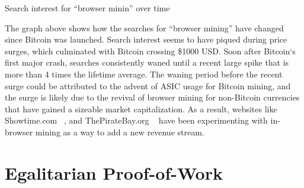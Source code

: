 \begin{center}
	\caption{Search interest for ``browser minin'' over time}
\end{center}

The graph above shows how the searches for ``browser mining'' have changed since Bitcoin was launched. Search interest seems to have piqued during price surges, which culminated with Bitcoin crossing \$1000 USD. Soon after Bitcoin`s first major crash, searches consistently waned until a recent large spike that is more than 4 times the lifetime average. The waning period before the recent surge could be attributed to the advent of ASIC usage for Bitcoin mining, and the surge is likely due to the revival of browser mining for non-Bitcoin currencies that have gained a sizeable market capitalization. As a result, websites like Showtime.com ~\cite{showtimehive}, and ThePirateBay.org ~\cite{piratesbayhive} have been experimenting with in-browser mining as a way to add a new revenue stream.

\section{Egalitarian Proof-of-Work}

